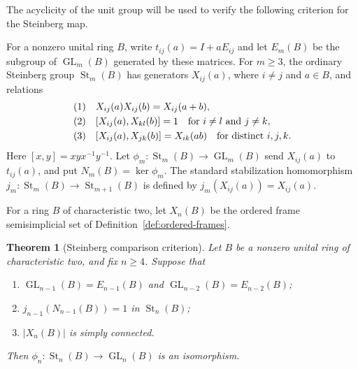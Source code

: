 \documentclass[10pt,a4paper]{amsart}
\DeclareMathOperator{\GL}{GL}
\DeclareMathOperator{\St}{St}
\newtheorem{theorem}{Theorem}[section]
\numberwithin{equation}{section}
\newcommand{\eqrownum}[1][]{%
  \hbox{\refstepcounter{equation}%
    \if\relax\detokenize{#1}\relax\else\label{#1}\fi
    \normalfont(\theequation)}}
\begin{document}
The acyclicity of the unit group will be used to verify the following criterion for the Steinberg map.

For a nonzero unital ring $B$, write $t_{ij}(a)=I+aE_{ij}$ and let $E_m(B)$ be the subgroup of $\GL_m(B)$ generated by these matrices. For $m\geq3$, the ordinary Steinberg group $\St_m(B)$ has generators $X_{ij}(a)$, where $i\ne j$ and $a\in B$, and relations
$$
\begin{aligned}
\eqrownum &\quad X_{ij}(a)X_{ij}(b)=X_{ij}(a+b),\\
\eqrownum &\quad [X_{ij}(a),X_{kl}(b)]=1 \quad \text{for }i\ne l\text{ and }j\ne k,\\
\eqrownum &\quad [X_{ij}(a),X_{jk}(b)]=X_{ik}(ab) \quad \text{for distinct }i,j,k.
\end{aligned}
$$
Here $[x,y]=xyx^{-1}y^{-1}$. Let $\phi_m:\St_m(B)\to\GL_m(B)$ send $X_{ij}(a)$ to $t_{ij}(a)$, and put $N_m(B)=\ker\phi_m$. The standard stabilization homomorphism $j_m:\St_m(B)\to\St_{m+1}(B)$ is defined by $j_m(X_{ij}(a))=X_{ij}(a)$.

For a ring $B$ of characteristic two, let $X_n(B)$ be the ordered frame semisimplicial set of Definition~\ref{def:ordered-frames}.


\begin{theorem}[Steinberg comparison criterion]
\label{thm:raw-criterion}
Let $B$ be a nonzero unital ring of characteristic two, and fix $n\geq4$. Suppose that
\begin{enumerate}
\item $\GL_{n-1}(B)=E_{n-1}(B)$ and $\GL_{n-2}(B)=E_{n-2}(B)$;
\item $j_{n-1}(N_{n-1}(B))=1$ in $\St_n(B)$;
\item $|X_n(B)|$ is simply connected.
\end{enumerate}
Then $\phi_n:\St_n(B)\to\GL_n(B)$ is an isomorphism.
\end{theorem}
\end{document}
